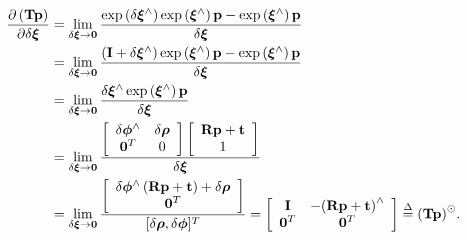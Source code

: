 \begin{align*}
\frac{{\partial \left( \mathbf{Tp} \right)}}{{\partial \delta \boldsymbol{\xi}}} &= \mathop {\lim }\limits_{\delta \boldsymbol{\xi}  \to \mathbf{0}} \frac{{\exp \left( {\delta {\boldsymbol{\xi} ^ \wedge }} \right)\exp \left( {{\boldsymbol{\xi} ^ \wedge }} \right) \mathbf{p} - \exp \left( {{\boldsymbol{\xi} ^ \wedge }} \right) \mathbf{p} }}{{\delta \boldsymbol{\xi} }}\\
&= \mathop {\lim }\limits_{\delta \boldsymbol{\xi}  \to \mathbf{0}} \frac{{\left( { \mathbf{I} + \delta {\boldsymbol{\xi} ^ \wedge }} \right)\exp \left( {{\boldsymbol{\xi} ^ \wedge }} \right) \mathbf{p} - \exp \left( {{\boldsymbol{\xi} ^ \wedge }} \right) \mathbf{p} }}{{\delta {\boldsymbol{\xi} }}}\\
&= \mathop {\lim }\limits_{\delta \boldsymbol{\xi}  \to \mathbf{0}} \frac{{\delta {\boldsymbol{\xi} ^ \wedge }\exp \left( {{\boldsymbol{\xi} ^ \wedge }} \right) \mathbf{p}}}{{\delta {\boldsymbol{\xi} }}}\\
&= \mathop {\lim }\limits_{\delta \boldsymbol{\xi}  \to \mathbf{0}} 
\frac{{\left[ {\begin{array}{*{20}{c}}
                {\delta { \boldsymbol{\phi} ^ \wedge }}&{\delta {\boldsymbol{\rho} }}\\
                {{\mathbf{0}^T}}&0
        \end{array}} \right]\left[ {\begin{array}{*{20}{c}}
                {\mathbf{Rp} + \mathbf{t}}\\
                1
        \end{array}} \right]}}{{\delta {\boldsymbol{\xi} }}}\\
&= \mathop {\lim }\limits_{\delta \boldsymbol{\xi}  \to \mathbf{0}} \frac{{\left[ {\begin{array}{*{20}{c}}
                {\delta {\boldsymbol{\phi} ^ \wedge }\left( {\mathbf{Rp} + \mathbf{t}} \right) + \delta {\boldsymbol{\rho} }}\\
                \mathbf{0}^T
        \end{array}} \right]}}{[\delta\boldsymbol{\rho},\delta \boldsymbol{\phi}]^T} = \left[ {\begin{array}{*{20}{c}}
        \mathbf{I} & { - {{\left( {\mathbf{Rp} + \mathbf{t}} \right)}^ \wedge }} \\
        {{\mathbf{0}}}^T & \mathbf{0}^T
\end{array}} \right] \buildrel \Delta \over = {\left( \mathbf{Tp} \right)^ \odot }.
\end{align*}

